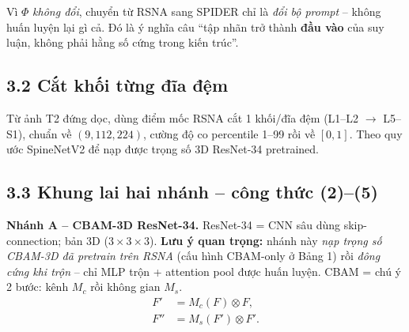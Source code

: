 \documentclass[12pt,a4paper]{article}
\begin{document}
Vì $\Phi$ \emph{không đổi}, chuyển từ RSNA sang SPIDER chỉ là \emph{đổi bộ prompt} -- không huấn luyện lại gì cả. Đó là ý nghĩa câu ``tập nhãn trở thành \textbf{đầu vào} của suy luận, không phải hằng số cứng trong kiến trúc''.

\subsection{3.2 Cắt khối từng đĩa đệm}
Từ ảnh T2 đứng dọc, dùng điểm mốc RSNA cắt 1 khối/đĩa đệm (L1--L2 $\to$ L5--S1), chuẩn về $(9,112,224)$, cường độ co percentile 1--99 rồi về $[0,1]$. Theo quy ước SpineNetV2 để nạp được trọng số 3D ResNet-34 pretrained.

\subsection{3.3 Khung lai hai nhánh -- công thức (2)--(5)}
\textbf{Nhánh A -- CBAM-3D ResNet-34.} ResNet-34 = CNN sâu dùng skip-connection; bản 3D ($3\times3\times3$). \textbf{Lưu ý quan trọng:} nhánh này \emph{nạp trọng số CBAM-3D đã pretrain trên RSNA} (cấu hình CBAM-only ở Bảng 1) rồi \emph{đông cứng khi trộn} -- chỉ MLP trộn + attention pool được huấn luyện. CBAM = chú ý 2 bước: kênh $M_c$ rồi không gian $M_s$.
\begin{align}
F' &= M_c(F)\otimes F, \label{eq:cbamc}\\
F'' &= M_s(F')\otimes F'. \label{eq:cbams}
\end{align}
\end{document}
